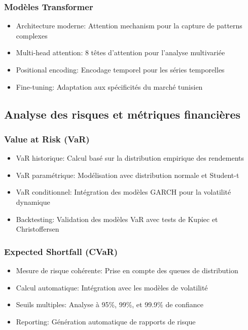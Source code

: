\documentclass[12pt,a4paper]{article}
\begin{document}
\subsubsection{Modèles Transformer}
\begin{itemize}
    \item Architecture moderne: Attention mechanism pour la capture de patterns complexes
    \item Multi-head attention: 8 têtes d'attention pour l'analyse multivariée
    \item Positional encoding: Encodage temporel pour les séries temporelles
    \item Fine-tuning: Adaptation aux spécificités du marché tunisien
\end{itemize}

\subsection{Analyse des risques et métriques financières}
\subsubsection{Value at Risk (VaR)}
\begin{itemize}
    \item VaR historique: Calcul basé sur la distribution empirique des rendements
    \item VaR paramétrique: Modélisation avec distribution normale et Student-t
    \item VaR conditionnel: Intégration des modèles GARCH pour la volatilité dynamique
    \item Backtesting: Validation des modèles VaR avec tests de Kupiec et Christoffersen
\end{itemize}

\subsubsection{Expected Shortfall (CVaR)}
\begin{itemize}
    \item Mesure de risque cohérente: Prise en compte des queues de distribution
    \item Calcul automatique: Intégration avec les modèles de volatilité
    \item Seuils multiples: Analyse à 95\%, 99\%, et 99.9\% de confiance
    \item Reporting: Génération automatique de rapports de risque
\end{itemize}
\end{document}
